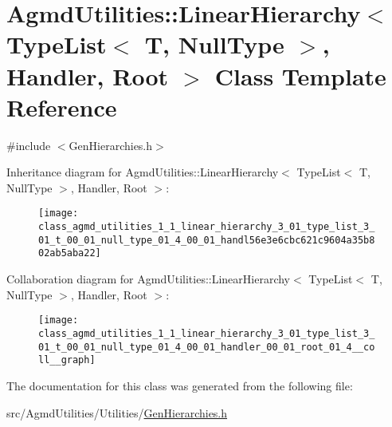 \hypertarget{class_agmd_utilities_1_1_linear_hierarchy_3_01_type_list_3_01_t_00_01_null_type_01_4_00_01_handler_00_01_root_01_4}{\section{Agmd\+Utilities\+:\+:Linear\+Hierarchy$<$ Type\+List$<$ T, Null\+Type $>$, Handler, Root $>$ Class Template Reference}
\label{class_agmd_utilities_1_1_linear_hierarchy_3_01_type_list_3_01_t_00_01_null_type_01_4_00_01_handler_00_01_root_01_4}
}


{\ttfamily \#include $<$Gen\+Hierarchies.\+h$>$}



Inheritance diagram for Agmd\+Utilities\+:\+:Linear\+Hierarchy$<$ Type\+List$<$ T, Null\+Type $>$, Handler, Root $>$\+:\nopagebreak
\begin{figure}[H]
\begin{center}
\leavevmode
\texttt{[image: class\_agmd\_utilities\_1\_1\_linear\_hierarchy\_3\_01\_type\_list\_3\_01\_t\_00\_01\_null\_type\_01\_4\_00\_01\_handl56e3e6cbc621c9604a35b802ab5aba22]}
\end{center}
\end{figure}


Collaboration diagram for Agmd\+Utilities\+:\+:Linear\+Hierarchy$<$ Type\+List$<$ T, Null\+Type $>$, Handler, Root $>$\+:\nopagebreak
\begin{figure}[H]
\begin{center}
\leavevmode
\texttt{[image: class\_agmd\_utilities\_1\_1\_linear\_hierarchy\_3\_01\_type\_list\_3\_01\_t\_00\_01\_null\_type\_01\_4\_00\_01\_handler\_00\_01\_root\_01\_4\_\_coll\_\_graph]}
\end{center}
\end{figure}


The documentation for this class was generated from the following file\+:\begin{DoxyCompactItemize}
\item 
src/\+Agmd\+Utilities/\+Utilities/\hyperlink{_gen_hierarchies_8h}{Gen\+Hierarchies.\+h}\end{DoxyCompactItemize}
